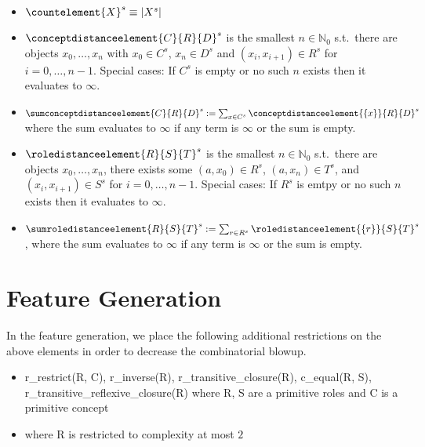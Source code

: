\documentclass{article}
\begin{document}
\begin{itemize}
    \item $\countelement{X}^s\equiv |X^s|$
    \item $\conceptdistanceelement{C}{R}{D}^s$ is the smallest $n\in\mathbb{N}_0$
    s.t.\ there are objects $x_0,\ldots,x_n$ with
    $x_0\in C^s$, $x_n\in D^s$ and $(x_i, x_{i+1})\in R^s$ for $i = 0,\ldots,n-1$.
    Special cases: If $C^s$ is empty or no such $n$ exists then it evaluates to $\infty$.
    \item $\sumconceptdistanceelement{C}{R}{D}^s:=\sum_{x\in C^s}\conceptdistanceelement{\{x\}}{R}{D}^s$
    where the sum evaluates to $\infty$ if any term is $\infty$ or the sum is empty.
    \item $\roledistanceelement{R}{S}{T}^s$ is the smallest $n\in\mathbb{N}_0$
    s.t.\ there are objects $x_0,\ldots,x_n$,
    there exists some $(a,x_0)\in R^s$, $(a,x_n)\in T^s$,
    and $(x_i, x_{i+1})\in S^s$ for $i = 0,\ldots,n-1$.
    Special cases: If $R^s$ is emtpy or no such $n$ exists then it evaluates to $\infty$.
    \item $\sumroledistanceelement{R}{S}{T}^s:=\sum_{r\in R^s}\roledistanceelement{\{r\}}{S}{T}^s$,
    where the sum evaluates to $\infty$ if any term is $\infty$ or the sum is empty.
\end{itemize}

\section{Feature Generation}

In the feature generation, we place the following additional restrictions on the above elements in order to decrease the combinatorial blowup.
\begin{itemize}
    \item r\_restrict(R, C), r\_inverse(R), r\_transitive\_closure(R), c\_equal(R, S), \\
          r\_transitive\_reflexive\_closure(R) where R, S are a primitive roles and C is a primitive concept
    \item {} where R is restricted to complexity at most $2$
\end{itemize}



\end{document}
